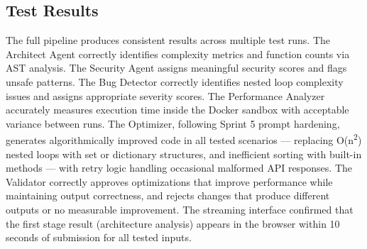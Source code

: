 \subsection{Test Results}
The full pipeline produces consistent results across multiple test runs. The Architect Agent correctly identifies complexity metrics and function counts via AST analysis. The Security Agent assigns meaningful security scores and flags unsafe patterns. The Bug Detector correctly identifies nested loop complexity issues and assigns appropriate severity scores. The Performance Analyzer accurately measures execution time inside the Docker sandbox with acceptable variance between runs. The Optimizer, following Sprint 5 prompt hardening, generates algorithmically improved code in all tested scenarios — replacing O(n\textsuperscript{2}) nested loops with set or dictionary structures, and inefficient sorting with built-in methods — with retry logic handling occasional malformed API responses. The Validator correctly approves optimizations that improve performance while maintaining output correctness, and rejects changes that produce different outputs or no measurable improvement. The streaming interface confirmed that the first stage result (architecture analysis) appears in the browser within 10 seconds of submission for all tested inputs.
